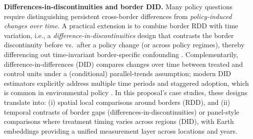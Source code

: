 \noindent\textbf{Differences-in-discontinuities and border DID.}
Many policy questions require distinguishing persistent cross-border differences from \emph{policy-induced changes over time}. A practical extension is to combine border RDD with time variation, i.e., a \emph{difference-in-discontinuities} design that contrasts the border discontinuity before vs.\ after a policy change (or across policy regimes), thereby differencing out time-invariant border-specific confounding \citep{grembi2016fiscal}. Complementarily, difference-in-differences (DID) compares changes over time between treated and control units under a (conditional) parallel-trends assumption; modern DID estimators explicitly address multiple time periods and staggered adoption, which is common in environmental policy \citep{callaway2021did}. In this proposal’s case studies, these designs translate into: (i) spatial local comparisons around borders (RDD), and (ii) temporal contrasts of border gaps (differences-in-discontinuities) or panel-style comparisons where treatment timing varies across regions (DID), with Earth embeddings providing a unified measurement layer across locations and years.

